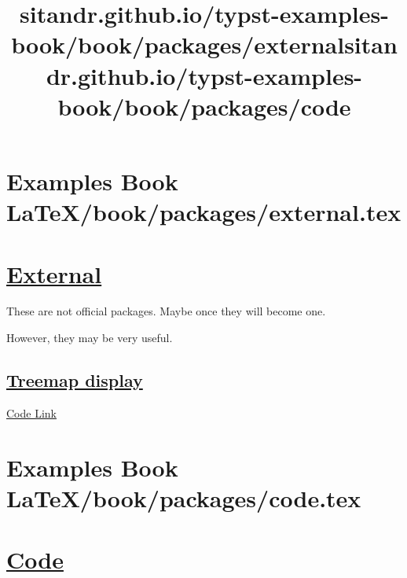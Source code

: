 \pandocbounded{}

\pandocbounded{}

\pandocbounded{}

\pandocbounded{}


\section{Examples Book LaTeX/book/packages/external.tex}
\title{sitandr.github.io/typst-examples-book/book/packages/external}

\section{\texorpdfstring{\hyperref[external]{External}}{External}}\label{external}

These are not official packages. Maybe once they will become one.

However, they may be very useful.

\subsection{\texorpdfstring{\hyperref[treemap-display]{Treemap
display}}{Treemap display}}\label{treemap-display}

\href{https://gist.github.com/taylorh140/9e353fdf737f1ef51aacb332efdd9516}{Code
Link}



\section{Examples Book LaTeX/book/packages/code.tex}
\title{sitandr.github.io/typst-examples-book/book/packages/code}

\section{\texorpdfstring{\hyperref[code]{Code}}{Code}}\label{code}

